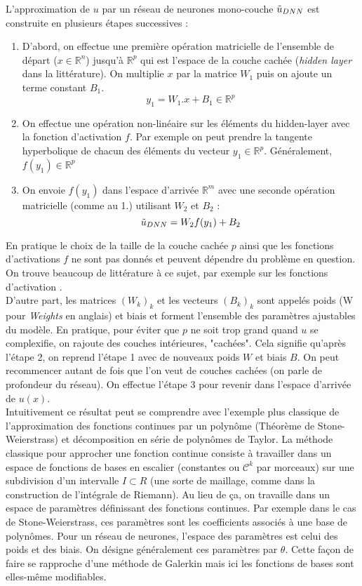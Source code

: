 L'approximation de $u$ par un réseau de neurones mono-couche $\Tilde{u}_{DNN}$ est construite en plusieurs étapes successives : 
\begin{enumerate}
    \item D'abord, on effectue une première opération matricielle de l'ensemble de départ ($x\in \mathbb{R}^n$) jusqu'à $\mathbb{R}^p$ qui est l'espace de la couche cachée (\textit{hidden layer} dans la littérature). On multiplie $x$ par la matrice $W_1$ puis on ajoute un terme constant $B_1$. 
    $$ y_1 = W_1 . x + B_1 \in \mathbb{R}^p$$
    \item On effectue une opération non-linéaire sur les éléments du hidden-layer avec la fonction d'activation $f$. Par exemple on peut prendre la tangente hyperbolique de chacun des éléments du vecteur $y_1 \in \mathbb{R}^p$. Généralement, $f(y_1) \in \mathbb{R}^p$ 
    \item On envoie $f(y_1)$ dans l'espace d'arrivée $\mathbb{R}^m$ avec une seconde opération matricielle (comme au 1.) utilisant $W_2$ et $B_2$ :
    $$ \Tilde{u}_{DNN} = W_2 f(y_1) + B_2 $$
\end{enumerate}
En pratique le choix de la taille de la couche cachée $p$ ainsi que les fonctions d'activations $f$ ne sont pas donnés et peuvent dépendre du problème en question. On trouve beaucoup de littérature à ce sujet, par exemple sur les fonctions d'activation \cite{leshnoMultilayerFeedforwardNetworks1993}.\\

D'autre part, les matrices $(W_k)_k$ et les vecteurs $(B_k)_k$ sont appelés poids (W pour \textit{Weights} en anglais) et biais et forment l'ensemble des paramètres ajustables du modèle. En pratique, pour éviter que $p$ ne soit trop grand quand $u$ se complexifie, on rajoute des couches intérieures, "cachées". Cela signifie qu'après l'étape 2, on reprend l'étape 1 avec de nouveaux poids $W$ et biais $B$. On peut recommencer autant de fois que l'on veut de couches cachées (on parle de profondeur du réseau). On effectue l'étape 3 pour revenir dans l'espace d'arrivée de $u(x)$. \\

Intuitivement ce résultat peut se comprendre avec l'exemple plus classique de l'approximation des fonctions continues par un polynôme (Théorème de Stone-Weierstrass) et décomposition en série de polynômes de Taylor. La méthode classique pour approcher une fonction continue consiste à travailler dans un espace de fonctions de bases en escalier (constantes ou $\mathcal{C}^k$ par morceaux) sur une subdivision d'un intervalle  $I \subset R$ (une sorte de maillage, comme dans la construction de l'intégrale de Riemann). Au lieu de ça, on travaille dans un espace de paramètres définissant des fonctions continues. Par exemple dans le cas de Stone-Weierstrass, ces paramètres sont les coefficients associés à une base de polynômes. Pour un réseau de neurones, l'espace des paramètres est celui des poids et des biais. On désigne généralement ces paramètres par $\theta$. Cette façon de faire se rapproche d'une méthode de Galerkin mais ici les fonctions de bases sont elles-même modifiables.\\

